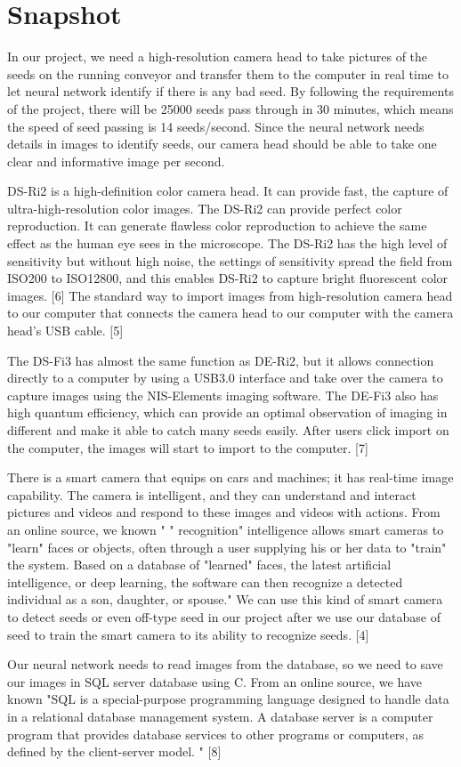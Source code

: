 \documentclass[onecolumn, draftclsnofoot,10pt, compsoc]{IEEEtran}
\begin{document}
\section{Snapshot}
\par
In our project, we need a high-resolution camera head to take pictures of the seeds on the running conveyor and transfer them to the computer in real time to let neural network identify if there is any bad seed. By following the requirements of the project, there will be 25000 seeds pass through in 30 minutes, which means the speed of seed passing is 14 seeds/second. Since the neural network needs details in images to identify seeds, our camera head should be able to take one clear and informative image per second.
\par
DS-Ri2 is a high-definition color camera head.  It can provide fast, the capture of ultra-high-resolution color images. The DS-Ri2 can provide perfect color reproduction. It can generate flawless color reproduction to achieve the same effect as the human eye sees in the microscope. The DS-Ri2 has the high level of sensitivity but without high noise, the settings of sensitivity spread the field from ISO200 to ISO12800, and this enables DS-Ri2 to capture bright fluorescent color images. [6] The standard way to import images from high-resolution camera head to our computer that connects the camera head to our computer with the camera head's USB cable. [5]
\par
The DS-Fi3 has almost the same function as DE-Ri2, but it allows connection directly to a computer by using a USB3.0 interface and take over the camera to capture images using the NIS-Elements imaging software. The DE-Fi3 also has high quantum efficiency, which can provide an optimal observation of imaging in different and make it able to catch many seeds easily. After users click import on the computer, the images will start to import to the computer. [7]
\par
There is a smart camera that equips on cars and machines; it has real-time image capability. The camera is intelligent, and they can understand and interact pictures and videos and respond to these images and videos with actions. From an online source, we known " " recognition" intelligence allows smart cameras to "learn" faces or objects, often through a user supplying his or her data to "train" the system. Based on a database of "learned" faces, the latest artificial intelligence, or deep learning, the software can then recognize a detected individual as a son, daughter, or spouse." We can use this kind of smart camera to detect seeds or even off-type seed in our project after we use our database of seed to train the smart camera to its ability to recognize seeds. [4]
\par
Our neural network needs to read images from the database, so we need to save our images in SQL server database using C. From an online source, we have known "SQL is a special-purpose programming language designed to handle data in a relational database management system. A database server is a computer program that provides database services to other programs or computers, as defined by the client-server model. " [8]
\pagebreak
\end{document}
